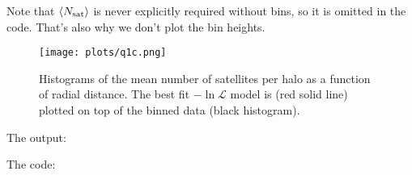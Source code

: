 Note that $\langle N_{\rm sat} \rangle$ is never explicitly required without bins, so it is omitted in the code. 
That's also why we don't plot the bin heights.

\begin{figure}[H]
    \centering
    \texttt{[image: plots/q1c.png]}
    \caption{Histograms of the mean number of satellites per halo as a function of radial distance. The best fit $-\ln \mathcal{L}$ model is
    (red solid line) plotted on top of the binned data (black histogram).
    }
\end{figure}

\noindent The output:



\noindent The code:

